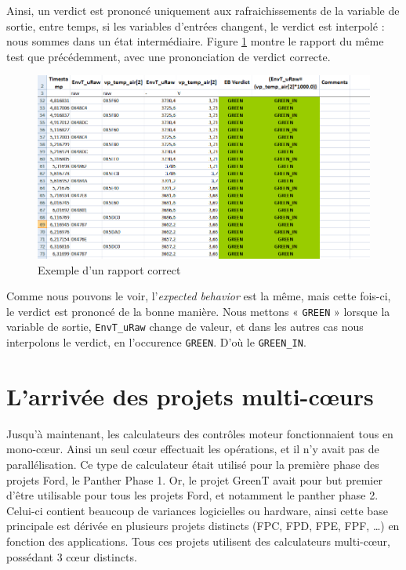 Ainsi, un verdict est prononcé uniquement aux rafraichissements de la variable de sortie, entre temps, si les variables d'entrées changent, le verdict est interpolé : nous sommes dans un état intermédiaire. Figure \ref{fig:goodReport} montre le rapport du même test que précédemment, avec une prononciation de verdict correcte. 

\begin{figure}[h]
\centering
\includegraphics[width=0.9\linewidth]{contents/images/goodReport}
\caption{Exemple d'un rapport correct}
\label{fig:goodReport}
\end{figure}

Comme nous pouvons le voir, l'\textit{expected behavior} est la même, mais cette fois-ci, le verdict est prononcé de la bonne manière. Nous mettons « \texttt{GREEN} » lorsque la variable de sortie, \texttt{EnvT\_uRaw} change de valeur, et dans les autres cas nous interpolons le verdict, en l'occurence \texttt{GREEN}. D'où le \texttt{GREEN\_IN}.


\section{L'arrivée des projets multi-cœurs}
Jusqu'à maintenant, les calculateurs des contrôles moteur fonctionnaient tous en mono-cœur. Ainsi un seul c\oe{}ur effectuait les opérations, et il n'y avait pas de parallélisation. Ce type de calculateur était utilisé pour la première phase des projets Ford, le Panther Phase 1. Or, le projet GreenT avait pour but premier d'être utilisable pour tous les projets Ford, et notamment le panther phase 2. Celui-ci contient beaucoup de variances logicielles ou hardware, ainsi cette base principale est dérivée en plusieurs projets distincts (FPC, FPD, FPE, FPF, \ldots) en fonction des applications. Tous ces projets utilisent des calculateurs multi-cœur, possédant 3 c\oe{}ur distincts. 

